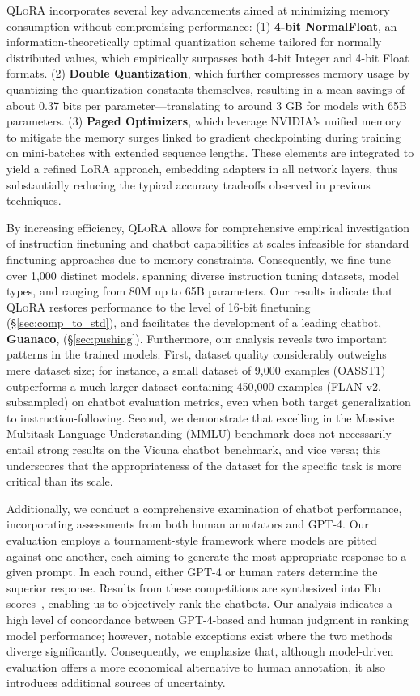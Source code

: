 \textsc{QLoRA} incorporates several key advancements aimed at minimizing memory consumption without compromising performance: (1) \textbf{4-bit NormalFloat}, an information-theoretically optimal quantization scheme tailored for normally distributed values, which empirically surpasses both 4-bit Integer and 4-bit Float formats. (2) \textbf{Double Quantization}, which further compresses memory usage by quantizing the quantization constants themselves, resulting in a mean savings of about 0.37 bits per parameter—translating to around 3 GB for models with 65B parameters. (3) \textbf{Paged Optimizers}, which leverage NVIDIA’s unified memory to mitigate the memory surges linked to gradient checkpointing during training on mini-batches with extended sequence lengths. These elements are integrated to yield a refined LoRA approach, embedding adapters in all network layers, thus substantially reducing the typical accuracy tradeoffs observed in previous techniques.

By increasing efficiency, \textsc{QLoRA} allows for comprehensive empirical investigation of instruction finetuning and chatbot capabilities at scales infeasible for standard finetuning approaches due to memory constraints. Consequently, we fine-tune over 1,000 distinct models, spanning diverse instruction tuning datasets, model types, and ranging from 80M up to 65B parameters. Our results indicate that \textsc{QLoRA} restores performance to the level of 16-bit finetuning (\S\ref{sec:comp_to_std}), and facilitates the development of a leading chatbot, \textbf{Guanaco}, (\S\ref{sec:pushing}). Furthermore, our analysis reveals two important patterns in the trained models. First, dataset quality considerably outweighs mere dataset size; for instance, a small dataset of 9,000 examples (OASST1) outperforms a much larger dataset containing 450,000 examples (FLAN v2, subsampled) on chatbot evaluation metrics, even when both target generalization to instruction-following. Second, we demonstrate that excelling in the Massive Multitask Language Understanding (MMLU) benchmark does not necessarily entail strong results on the Vicuna chatbot benchmark, and vice versa; this underscores that the appropriateness of the dataset for the specific task is more critical than its scale.

Additionally, we conduct a comprehensive examination of chatbot performance, incorporating assessments from both human annotators and GPT-4. Our evaluation employs a tournament-style framework where models are pitted against one another, each aiming to generate the most appropriate response to a given prompt. In each round, either GPT-4 or human raters determine the superior response. Results from these competitions are synthesized into Elo scores~\citep{elo1967proposed, elo1978rating}, enabling us to objectively rank the chatbots. Our analysis indicates a high level of concordance between GPT-4-based and human judgment in ranking model performance; however, notable exceptions exist where the two methods diverge significantly. Consequently, we emphasize that, although model-driven evaluation offers a more economical alternative to human annotation, it also introduces additional sources of uncertainty.

